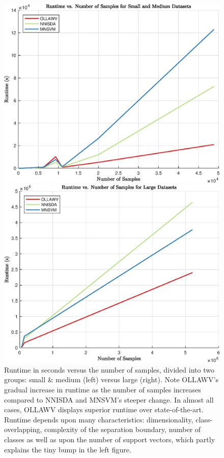 \documentclass[reqno]{vcuthesis}
\numberwithin{equation}{chapter}
\begin{document}
\begin{figure}[t!]
\centering
\begin{minipage}{0.49\textwidth}
\includegraphics[width=\textwidth]{figures/CPU_vs_NumData_SM.eps}
\end{minipage}
\begin{minipage}{0.49\textwidth}
\includegraphics[width=\textwidth]{figures/CPU_vs_NumData_L.eps}
\end{minipage}
\caption{\small Runtime in seconds versus the number of samples, divided into two groups: small \& medium (left) versus large (right). Note OLLAWV's gradual increase in runtime as the number of samples increases compared to NNISDA and MNSVM's steeper change. In almost all cases, OLLAWV displays superior runtime over state-of-the-art. Runtime depends upon many characteristics: dimensionality, class-overlapping, complexity of the separation boundary, number of classes as well as upon the number of support vectors, which partly explains the tiny bump in the left figure. }
\label{fig:cpuvssamples}
\end{figure}
\end{document}
